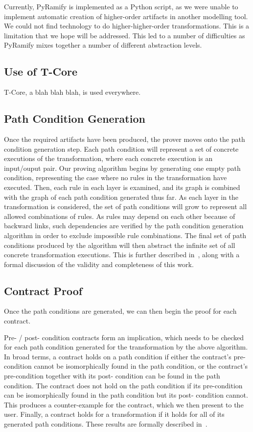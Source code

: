 Currently, PyRamify is implemented as a Python script, as we were unable to implement automatic creation of higher-order artifacts in another modelling tool. We could not find technology to do higher-higher-order transformations. This is a limitation that we hope will be addressed. This led to a number of difficulties as PyRamify mixes together a number of different abstraction levels. 

\subsection{Use of T-Core}

T-Core, a blah blah blah, is used everywhere.


\subsection{Path Condition Generation}

Once the required artifacts have been produced, the prover moves onto the path condition generation step.  Each
path condition will represent a set of concrete executions
of the transformation, where each concrete execution is an
input/ouput pair.
Our proving algorithm begins by generating one empty
path condition, representing the case where no rules in the
transformation have executed. Then, each rule in each layer
is examined, and its graph is combined with the graph of
each path condition generated thus far. As each layer in the
transformation is considered, the set of path conditions will
grow to represent all allowed combinations of rules. As rules
may depend on each other because of backward links, such
dependencies are verified by the path condition generation
algorithm in order to exclude impossible rule combinations.
The final set of path conditions produced by the algorithm
will then abstract the infinite set of all concrete transformation
executions. This is further described in~\cite{Lucio2014}, along with a
formal discussion of the validity and completeness of this
work.

\subsection{Contract Proof}

Once the path conditions are generated, we can then begin the proof for each contract.

Pre- / post- condition contracts form an implication, which
needs to be checked for each path condition generated for
the transformation by the above algorithm. In broad terms,
a contract holds on a path condition if either the contract’s
pre-condition cannot be isomorphically found in the path
condition, or the contract’s pre-condition together with its post-
condition can be found in the path condition. The contract
does not hold on the path condition if its pre-condition can
be isomorphically found in the path condition but its post-
condition cannot. This produces a counter-example for the contract, which we then present to the user. Finally, a contract holds for a transformation if it holds for all of its generated path conditions. These results
are formally described in~\cite{Lucio2014}.


